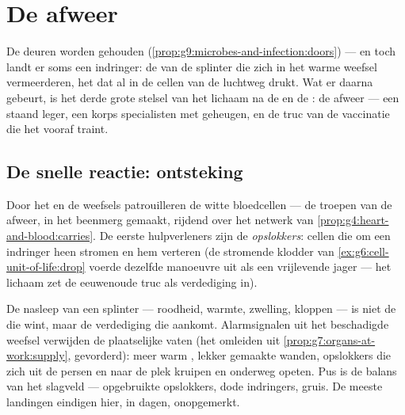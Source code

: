\chapter{De afweer}\label{ch:g9:immune-defenses}

De deuren worden gehouden
(\cref{prop:g9:microbes-and-infection:doors}) --- en toch landt er
soms een indringer: de  van de splinter die zich in het
warme weefsel vermeerderen, het  dat al in de cellen van de
luchtweg drukt. Wat er daarna gebeurt, is het derde grote stelsel
van het lichaam na de  en de : de afweer --- een
staand leger, een korps specialisten met geheugen, en de truc van
de vaccinatie die het vooraf traint.

\section{De snelle reactie: ontsteking}

\begin{definition}\label{def:g9:immune-defenses:standing}
Door het  en de weefsels patrouilleren de witte
bloedcellen --- de troepen van de afweer, in
het beenmerg gemaakt, rijdend over het netwerk van
\cref{prop:g4:heart-and-blood:carries}. De eerste hulpverleners
zijn de \emph{opslokkers}: cellen die om een indringer heen
stromen en hem verteren (de stromende klodder van
\cref{ex:g6:cell-unit-of-life:drop} voerde dezelfde manoeuvre uit
als een vrijlevende jager --- het lichaam zet de eeuwenoude truc
als verdediging in).
\end{definition}

\begin{proposition}\label{prop:g9:immune-defenses:inflammation}
De nasleep van een splinter --- roodheid, warmte, zwelling,
kloppen --- is niet de  die wint, maar de verdediging die
aankomt. Alarmsignalen uit het beschadigde weefsel verwijden de
plaatselijke vaten (het omleiden uit
\cref{prop:g7:organs-at-work:supply}, gevorderd): meer warm ,
lekker gemaakte wanden, opslokkers die zich uit de 
persen en naar de plek kruipen en onderweg  opeten. Pus is
de balans van het slagveld --- opgebruikte opslokkers, dode
indringers, gruis. De meeste landingen eindigen hier, in dagen,
onopgemerkt.
\end{proposition}
\admitted

